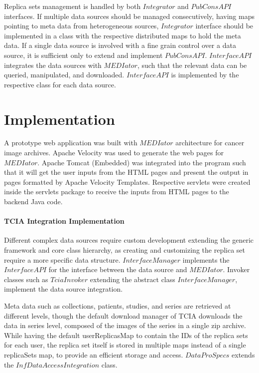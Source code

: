 \documentclass[conference]{IEEEtran}
\begin{document}
Replica sets management is handled by both $Integrator$ and $PubConsAPI$ interfaces. If multiple data sources should be managed consecutively, having maps pointing to meta data from heterogeneous sources, $Integrator$ interface should be implemented in a class with the respective distributed maps to hold the meta data. If a single data source is involved with a fine grain control over a data source, it is sufficient only to extend and implement $PubConsAPI$. $InterfaceAPI$ integrates the data sources with $MEDIator$, such that the relevant data can be queried, manipulated, and downloaded. $InterfaceAPI$ is implemented by the respective class for each data source.


\section{Implementation}
A prototype web application was built with $MEDIator$ architecture for cancer image archives. Apache Velocity was used to generate the web pages for $MEDIator$. Apache Tomcat (Embedded) was integrated into the program such that it will get the user inputs from the HTML pages and present the output in pages formatted by Apache Velocity Templates. Respective servlets were created inside the servlets package to receive the inputs from HTML pages to the backend Java code.

\paragraph*{\textbf{TCIA Integration Implementation}}
Different complex data sources require custom development extending the generic framework and core class hierarchy, as creating and customizing the replica set require a more specific data structure. $InterfaceManager$ implements the $InterfaceAPI$ for the interface between the data source and $MEDIator$. Invoker classes such as $TciaInvoker$ extending the abstract class $InterfaceManager$, implement the data source integration.

Meta data such as collections, patients, studies, and series are retrieved at different levels, though the default download manager of TCIA downloads the data in series level, composed of the images of the series in a single zip archive. While having the default userReplicasMap to contain the IDs of the replica sets for each user, the replica set itself is stored in multiple maps instead of a single replicaSets map, to provide an efficient storage and access. $DataProSpecs$ extends the $InfDataAccessIntegration$ class. 
\end{document}
